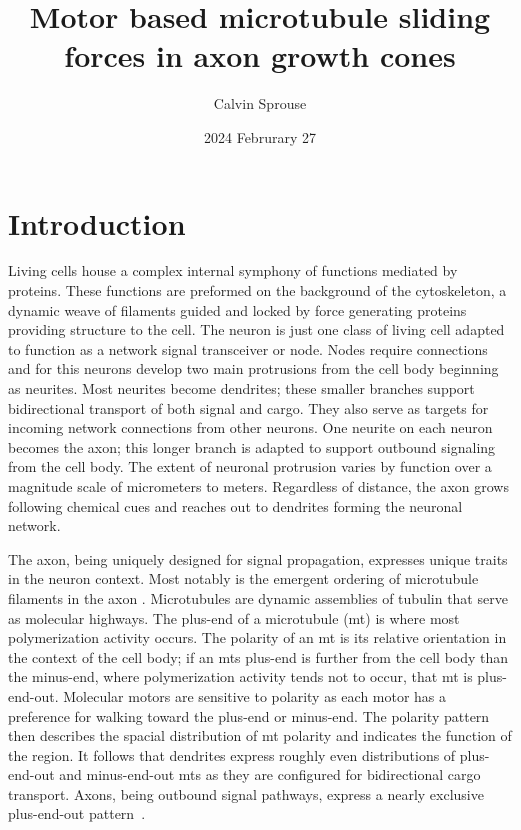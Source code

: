\documentclass[a4paper, 12pt]{article}
\title{Motor based microtubule sliding forces in axon growth cones}
\author{Calvin Sprouse}
\affil{PHYS 322, Winter 2024}
\date{2024 Februrary 27}
\begin{document}
\maketitle

\section*{Introduction}
Living cells house a complex internal symphony of functions mediated by proteins. These functions are preformed on the background of the cytoskeleton, a dynamic weave of filaments guided and locked by force generating proteins providing structure to the cell. The neuron is just one class of living cell adapted to function as a network signal transceiver or node. Nodes require connections and for this neurons develop two main protrusions from the cell body beginning as neurites. Most neurites become dendrites; these smaller branches support bidirectional transport of both signal and cargo. They also serve as targets for incoming network connections from other neurons. One neurite on each neuron becomes the axon; this longer branch is adapted to support outbound signaling from the cell body. The extent of neuronal protrusion varies by function over a magnitude scale of micrometers to meters. Regardless of distance, the axon grows following chemical cues and reaches out to dendrites forming the neuronal network.

The axon, being uniquely designed for signal propagation, expresses uni\-que traits in the neuron context. Most notably is the emergent ordering of microtubule filaments in the axon \cite{nedelec1997n13}. Microtubules are dynamic assemblies of tubulin that serve as molecular highways. The plus-end of a microtubule (mt) is where most polymerization activity occurs. The polarity of an mt is its relative orientation in the context of the cell body; if an mts plus-end is further from the cell body than the minus-end, where polymerization activity tends not to occur, that mt is plus-end-out. Molecular motors are sensitive to polarity as each motor has a preference for walking toward the plus-end or minus-end. The polarity pattern then describes the spacial distribution of mt polarity and indicates the function of the region. It follows that dendrites express roughly even distributions of plus-end-out and minus-end-out mts as they are configured for bidirectional cargo transport. Axons, being outbound signal pathways, express a nearly exclusive plus-end-out pattern~\cite{nedelec1997n13}.
\end{document}
